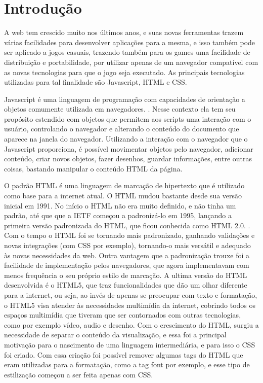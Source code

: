 \section{Introdução}

A web tem crescido muito nos últimos anos, e suas novas ferramentas trazem várias
facilidades para desenvolver aplicações para a mesma, e isso também pode ser aplicado
a jogos casuais, trazendo também para os games uma facilidade de distribuição e portabilidade,
por utilizar apenas de um navegador compatível com as novas tecnologias
para que o jogo seja executado. As principais tecnologias utilizadas
para tal finalidade são Javascript, HTML e CSS.

Javascript é uma linguagem de programação com capacidades de orientação a objetos comumente utilizada em
navegadores. \cite{flanagan2006javascript}. Nesse contexto ela tem seu propósito estendido com objetos que permitem
aos scripts uma interação com o usuário, controlando o navegador e alterando o conteúdo
do documento que aparece na janela do navegador.
Utilizando a interação com o navegador que o Javascript proporciona, é possível movimentar
objetos pelo navegador, adicionar conteúdo, criar novos objetos, fazer desenhos, guardar
informações, entre outras coisas, bastando manipular o conteúdo HTML da página.

O padrão HTML é uma linguagem de marcação de hipertexto que é utilizado como base para a internet
atual. O HTML mudou bastante desde sua versão inicial em 1991.
No início o HTML não era muito definido, e não tinha um padrão, até que que a
IETF começou a padronizá-lo em 1995, lançando a
primeira versão padronizada do HTML, que ficou conhecida como HTML 2.0. \cite{powell2003html}.
Com o tempo o HTML foi se tornando mais padronizado, ganhando validações e novas integrações
(com CSS por exemplo), tornando-o mais versátil e adequado às novas necessidades da
web. Outra vantagem que a padronização trouxe foi a facilidade de implementação pelos
navegadores, que agora implementavam com menos frequência o seu próprio estilo de marcação.
A ultima versão do HTML desenvolvida é o HTML5, que traz funcionalidades que dão um
olhar diferente para a internet, ou seja, ao invés de apenas se preocupar com texto
e formatação, o HTML5 visa atender às necessidades multimídia da internet, cobrindo
todos os espaços multimídia que tiveram que ser contornados com outras tecnologias,
como por exemplo vídeo, audio e desenho.
Com o crescimento do HTML, surgiu a necessidade de separar o conteúdo
da visualização, e essa foi a principal motivação para o nascimento de
uma linguagem intermediária, e para isso o CSS foi criado.
Com essa criação foi possível remover algumas tags do HTML que eram utilizadas
para a formatação, como a tag font por exemplo, e esse tipo de
estilização começou a ser feita apenas com CSS.


